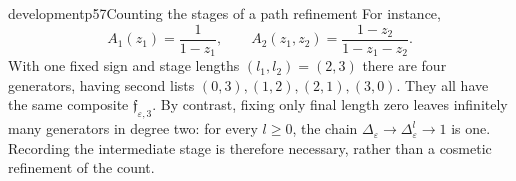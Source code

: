 \begin{dcomment}{development}{p57}{Counting the stages of a path refinement}
For instance,
\[
 A_1(z_1)=\frac1{1-z_1},\qquad
 A_2(z_1,z_2)=\frac{1-z_2}{1-z_1-z_2}.
\]
With one fixed sign and stage lengths $(l_1,l_2)=(2,3)$ there are four generators, having second lists $(0,3),(1,2),(2,1),(3,0)$. They all have the same composite $\mathfrak f_{\varepsilon,3}$. By contrast, fixing only final length zero leaves infinitely many generators in degree two: for every $l\geq0$, the chain $\Delta_\varepsilon\to\Delta_\varepsilon^l\to1$ is one. Recording the intermediate stage is therefore necessary, rather than a cosmetic refinement of the count.
\end{dcomment}
